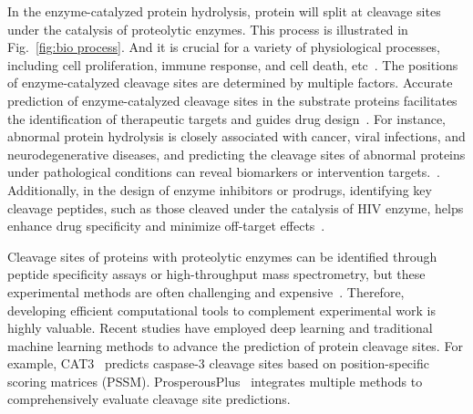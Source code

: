 In the enzyme-catalyzed protein hydrolysis, protein will split at cleavage sites under the catalysis of proteolytic enzymes. This process is illustrated in Fig.~\ref{fig:bio process}. 
And it is crucial for a variety of physiological processes, including cell proliferation, immune response, and cell death, etc~\cite{dixit2023road}. 
The positions of enzyme-catalyzed cleavage sites are determined by multiple factors.
Accurate prediction of enzyme-catalyzed cleavage sites in the substrate proteins facilitates the identification of therapeutic targets and guides drug design~\cite{turk2006targeting}. For instance, abnormal protein hydrolysis is closely associated with cancer, viral infections, and neurodegenerative diseases, and predicting the cleavage sites of abnormal proteins under pathological conditions can reveal biomarkers or intervention targets.~\cite{mccauley2016hepatitis, liu2021modular}. 
Additionally, in the design of enzyme inhibitors or prodrugs, identifying key cleavage peptides, such as those cleaved under the catalysis of HIV enzyme, helps enhance drug specificity and minimize off-target effects~\cite{devroe2005hiv, lv2015hiv}.

Cleavage sites of proteins with proteolytic enzymes can be identified through peptide specificity assays or high-throughput mass spectrometry, but these experimental methods are often challenging and expensive~\cite{Zheng2020}. Therefore, developing efficient computational tools to complement experimental work is highly valuable. Recent studies have employed deep learning and traditional machine learning methods to advance the prediction of protein cleavage sites. For example, CAT3~\cite{CAT3} predicts caspase-3 cleavage sites based on position-specific scoring matrices (PSSM). {ProsperousPlus}~\cite{ProsperousPlus} integrates multiple methods to comprehensively evaluate cleavage site predictions.  


